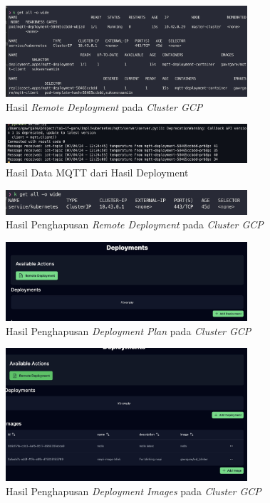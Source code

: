 \begin{figure}[ht]
  \centering
  \includegraphics[width=0.8\textwidth]{resources/chapter-4/pengujian/pengujian-sistem-gcp-06.jpg}
  \caption{Hasil \textit{Remote Deployment} pada \textit{Cluster GCP}}
  \label{fig:pengujian-sistem-gcp-06}
\end{figure}

\begin{figure}[ht]
  \centering
  \includegraphics[width=0.8\textwidth]{resources/chapter-4/pengujian/pengujian-sistem-gcp-sukses-mqtt.jpg}
  \caption{Hasil Data MQTT dari Hasil Deployment}
  \label{fig:pengujian-sistem-gcp-sukses-mqtt}
\end{figure}

\begin{figure}[ht]
  \centering
  \includegraphics[width=0.8\textwidth]{resources/chapter-4/pengujian/pengujian-sistem-gcp-07.jpg}
  \caption{Hasil Penghapusan \textit{Remote Deployment} pada \textit{Cluster GCP}}
  \label{fig:pengujian-sistem-gcp-07}
\end{figure}

\begin{figure}[ht]
  \centering
  \includegraphics[width=0.8\textwidth]{resources/chapter-4/pengujian/pengujian-sistem-gcp-08.jpg}
  \caption{Hasil Penghapusan \textit{Deployment Plan} pada \textit{Cluster GCP}}
  \label{fig:pengujian-sistem-gcp-08}
\end{figure}

\begin{figure}[ht]
  \centering
  \includegraphics[width=0.8\textwidth]{resources/chapter-4/pengujian/pengujian-sistem-gcp-09.jpg}
  \caption{Hasil Penghapusan \textit{Deployment Images} pada \textit{Cluster GCP}}
  \label{fig:pengujian-sistem-gcp-09}
\end{figure}